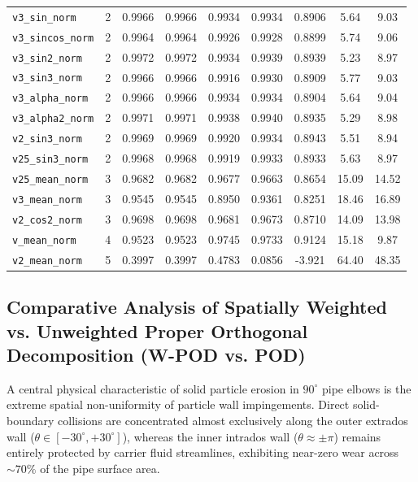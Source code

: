 \documentclass{article}
\begin{document}
\begin{landscape}
\begin{table}[p]
{\begin{tabular}{l c cccc c cc}
\texttt{v3\_sin\_norm} & 2 & 0.9966 & 0.9966 & 0.9934 & 0.9934 & 0.8906 & 5.64 & 9.03 \\
\texttt{v3\_sincos\_norm} & 2 & 0.9964 & 0.9964 & 0.9926 & 0.9928 & 0.8899 & 5.74 & 9.06 \\
\texttt{v3\_sin2\_norm} & 2 & 0.9972 & 0.9972 & 0.9934 & 0.9939 & 0.8939 & 5.23 & 8.97 \\
\texttt{v3\_sin3\_norm} & 2 & 0.9966 & 0.9966 & 0.9916 & 0.9930 & 0.8909 & 5.77 & 9.03 \\
\texttt{v3\_alpha\_norm} & 2 & 0.9966 & 0.9966 & 0.9934 & 0.9934 & 0.8904 & 5.64 & 9.04 \\
\texttt{v3\_alpha2\_norm} & 2 & 0.9971 & 0.9971 & 0.9938 & 0.9940 & 0.8935 & 5.29 & 8.98 \\
\texttt{v2\_sin3\_norm} & 2 & 0.9969 & 0.9969 & 0.9920 & 0.9934 & 0.8943 & 5.51 & 8.94 \\
\texttt{v25\_sin3\_norm} & 2 & 0.9968 & 0.9968 & 0.9919 & 0.9933 & 0.8933 & 5.63 & 8.97 \\
\midrule
\texttt{v25\_mean\_norm} & 3 & 0.9682 & 0.9682 & 0.9677 & 0.9663 & 0.8654 & 15.09 & 14.52 \\
\texttt{v3\_mean\_norm} & 3 & 0.9545 & 0.9545 & 0.8950 & 0.9361 & 0.8251 & 18.46 & 16.89 \\
\texttt{v2\_cos2\_norm} & 3 & 0.9698 & 0.9698 & 0.9681 & 0.9673 & 0.8710 & 14.09 & 13.98 \\
\midrule
\texttt{v\_mean\_norm} & 4 & 0.9523 & 0.9523 & 0.9745 & 0.9733 & 0.9124 & 15.18 & 9.87 \\
\midrule
\texttt{v2\_mean\_norm} & 5 & 0.3997 & 0.3997 & 0.4783 & 0.0856 & -3.921 & 64.40 & 48.35 \\
\bottomrule
\end{tabular}%
}
\end{table}
\end{landscape}

\subsection{Comparative Analysis of Spatially Weighted vs. Unweighted Proper Orthogonal Decomposition (W-POD vs. POD)}
\label{sec:wpod_vs_pod}

A central physical characteristic of solid particle erosion in $90^\circ$ pipe elbows is the extreme spatial non-uniformity of particle wall impingements. Direct solid-boundary collisions are concentrated almost exclusively along the outer extrados wall ($\theta \in [-30^\circ, +30^\circ]$), whereas the inner intrados wall ($\theta \approx \pm\pi$) remains entirely protected by carrier fluid streamlines, exhibiting near-zero wear across $\sim 70\%$ of the pipe surface area.
\end{document}
